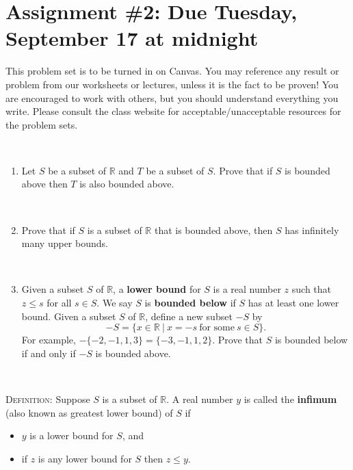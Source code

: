 \documentclass[12pt]{amsart}
\newcommand{\R}{\mathbb{R}}
\newcommand{\showsol}[1]{\def\displaysol{#1}}
\begin{document}
\showsol{1}
	
	\thispagestyle{empty}
	
	\section*{Assignment \#2: Due Tuesday, September 17 at midnight}
	
	This problem set is to be turned in on Canvas. You may reference any result or problem from our worksheets or lectures, unless it is the fact to be proven! You are encouraged to work with others, but you should understand everything you write. Please consult the class website for acceptable/unacceptable resources for the problem sets.
	
	\
	
	



\begin{enumerate}
\item Let $S$ be a subset of $\R$ and $T$ be a subset of $S$. Prove that if $S$ is bounded above
then $T$ is also bounded above.

\

\item Prove that if $S$ is a subset of $\R$ that is bounded above, then $S$ has infinitely many upper bounds.

\

\item Given a subset $S$ of $\R$, a \textbf{lower bound} for $S$ is a real number $z$ such that $z \leq s$ for all $s \in S$.
We say $S$ is \textbf{bounded below} if $S$ has at least one lower bound.
Given a subset $S$ of $\R$, define a new subset $-S$ by
\[-S = \{x \in \R \ | \ x = -s \ \text{for some} \ s \in S\}.\]
For example, $- \{-2,-1, 1, 3\} = \{-3, -1, 1, 2\}.$
Prove that $S$ is bounded below if and only if $-S$ is bounded above.
\end{enumerate}

\

\noindent \textsc{Definition:} Suppose $S$ is a subset of $\R$. A real number $y$ is called the \textbf{infimum} (also known as greatest
lower bound) of $S$ if
\begin{itemize}
\item $y$ is a lower bound for $S$, and
\item if $z$ is any lower bound for $S$ then $z \leq y$.
\end{itemize}

\
\end{document}
